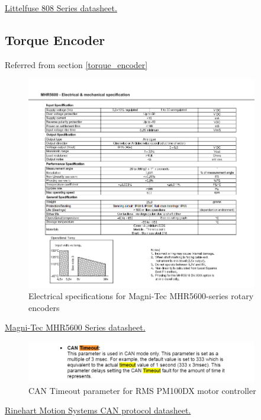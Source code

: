 \documentclass{article}
\begin{document}
\href{http://www.littelfuse.com/~/media/c635bf51279f4ef6bedee5deb356e102.ashx}{Littelfuse 808 Series datasheet.}

\setcounter{subsection}{6}
\subsection{Torque Encoder}\label{appendix_torque_encoder}
Referred from section \ref{torque_encoder}

\begin{figure}[H]
    \centering
    \includegraphics[width=0.9\textwidth]{MHR5600_electrical_specifications.png}
    \caption{Electrical specifications for Magni-Tec MHR5600-series rotary encoders}
    \label{fig:mhr5600_series}
\end{figure}

\href{http://www.magni-tec.com/datasheet/WS-MHR5600.pdf}{Magni-Tec MHR5600 Series datasheet.}

\begin{figure}[H]
    \centering
    \includegraphics[width=0.9\textwidth]{RMS_CAN_timeout.png}
    \caption{CAN Timeout parameter for RMS PM100DX motor controller}
    \label{fig:RMS_CAN_timeout}
\end{figure}

\href{https://app.box.com/s/4fb49r9p6lzfz4uwcb5izkxpcwh768vc}{Rinehart Motion Systems CAN protocol datasheet.}
\end{document}

